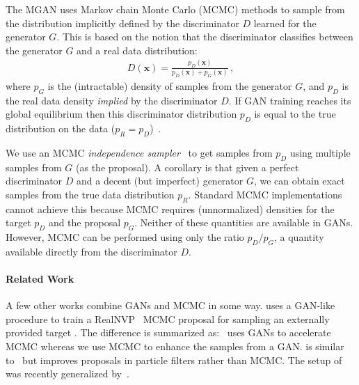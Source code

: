 \documentclass{article}
\renewcommand{\vec}[1]{{\boldsymbol{\mathbf{#1}}}} %
\newcommand{\target}{{p^\star}}
\newcommand{\PG}{{p_G}}
\newcommand{\PD}{{p_D}}
\newcommand{\PR}{{p_R}}
\begin{document}
The MGAN uses Markov chain Monte Carlo (MCMC) methods to sample from the distribution implicitly defined by the discriminator $D$ learned for the generator $G$.
This is based on the notion that the discriminator classifies between the generator $G$ and a real data distribution:
\begin{align}
  D(\vec x) = \frac{\PD(\vec x)}{\PD(\vec x) + \PG(\vec x)}\,, \label{eq:define PD}
\end{align}
where $\PG$ is the (intractable) density of samples from the generator $G$, and $\PD$ is the real data density \emph{implied} by the discriminator $D$.
If GAN training reaches its global equilibrium then this discriminator distribution $\PD$ is equal to the true distribution on the data ($\PR = \PD$)~\citep{Goodfellow2014}.

We use an MCMC \emph{independence sampler}~\citep{Tierney1994} to get samples from $\PD$ using multiple samples from $G$ (as the proposal)\@.
A corollary is that given a perfect discriminator $D$ and a decent (but imperfect) generator $G$, we can obtain exact samples from the true data distribution $\PR$.
Standard MCMC implementations cannot achieve this because MCMC requires (unnormalized) densities for the target $\PD$ and the proposal $\PG$.
Neither of these quantities are available in GANs.
However, MCMC can be performed using only the ratio $\PD / \PG$, a quantity available directly from the discriminator $D$.

\paragraph{Related Work}
A few other works combine GANs and MCMC in some way.
\citet{Song2017} uses a GAN-like procedure to train a RealNVP~\citep{Dinh2016} MCMC proposal for sampling an externally provided target \smash{$\target$}.
The difference is summarized as:~\citet{Song2017} uses GANs to accelerate MCMC whereas we use MCMC to enhance the samples from a GAN\@.
\citet{Kempinska2017} is similar to~\citet{Song2017} but improves proposals in particle filters rather than MCMC\@.
The setup of~\citet{Song2017} was recently generalized by~\citet{Neklyudov2018}.
\end{document}
